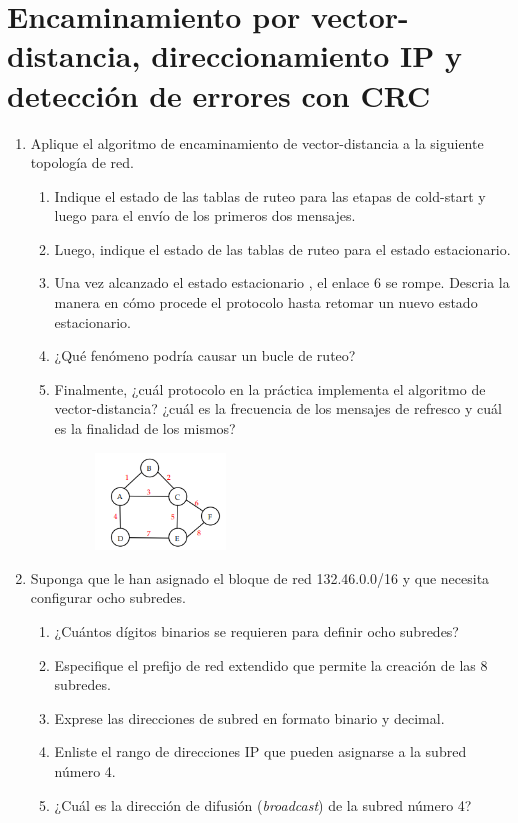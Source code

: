 \section*{Encaminamiento por vector-distancia, direccionamiento IP y detecci\'on de errores con CRC}

\begin{enumerate}
    \item Aplique el algoritmo de encaminamiento de vector-distancia a la siguiente topolog\'ia de red.
    \begin{enumerate}
        \item Indique el estado de las tablas de ruteo para las etapas de cold-start y luego para el env\'io de los primeros dos mensajes.
        \item Luego, indique el estado de las tablas de ruteo para el estado estacionario.
        \item Una vez alcanzado el estado estacionario , el enlace 6 se rompe. Descria la manera en c\'omo procede el protocolo hasta retomar
        un nuevo estado estacionario.
        \item ¿Qu\'e fen\'omeno podr\'ia causar un bucle de ruteo?
        \item Finalmente, ¿cu\'al protocolo en la pr\'actica implementa el algoritmo de vector-distancia? ¿cu\'al es la frecuencia de los mensajes
        de refresco y cu\'al es la finalidad de los mismos?

        \begin{figure}[H]
            \centering
            \includegraphics[width=0.35\textwidth]{img/Vector-distancia.png}
        \end{figure}
    \end{enumerate}

    \item Suponga que le han asignado el bloque de red 132.46.0.0/16 y que necesita configurar ocho subredes.
    \begin{enumerate}
        \item ¿Cu\'antos d\'igitos binarios se requieren para definir ocho subredes?
        \item Especifique el prefijo de red extendido que permite la creaci\'on de las 8 subredes.
        \item Exprese las direcciones de subred en formato binario y decimal.
        \item Enliste el rango de direcciones IP que pueden asignarse a la subred n\'umero 4.
        \item ¿Cu\'al es la direcci\'on de difusi\'on (\textit{broadcast}) de la subred n\'umero 4?
    \end{enumerate}


\end{enumerate}
